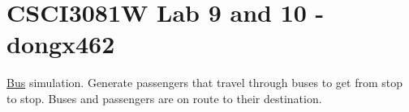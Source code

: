 \hypertarget{index_intro_sec}{}\section{C\+S\+C\+I3081\+W Lab 9 and 10 -\/ dongx462}\label{index_intro_sec}
\hyperlink{classBus}{Bus} simulation. Generate passengers that travel through buses to get from stop to stop. Buses and passengers are on route to their destination. 